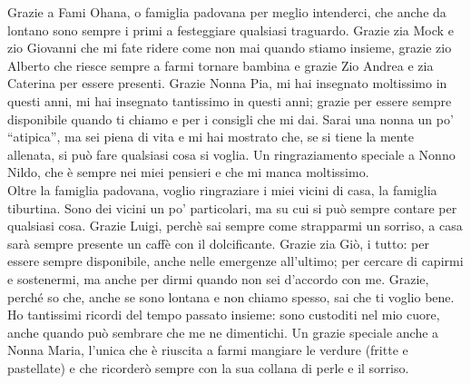 \begin{acknowledgments}
Grazie a Fami Ohana, o famiglia padovana per meglio intenderci, che anche da lontano sono sempre i primi a festeggiare qualsiasi traguardo. Grazie zia Mock e zio Giovanni che mi fate ridere come non mai quando stiamo insieme, grazie zio Alberto che riesce sempre a farmi tornare bambina e grazie Zio Andrea e zia Caterina per essere presenti. Grazie Nonna Pia, mi hai insegnato moltissimo in questi anni, mi hai insegnato tantissimo in questi anni; grazie per essere sempre disponibile quando ti chiamo e per i consigli che mi dai. Sarai una nonna un po’ “atipica”, ma sei piena di vita e mi hai mostrato che, se si tiene la mente allenata, si può fare qualsiasi cosa si voglia. Un ringraziamento speciale a Nonno Nildo, che è sempre nei miei pensieri e che mi manca moltissimo. \\

Oltre la famiglia padovana, voglio ringraziare i miei vicini di casa, la famiglia tiburtina. Sono dei vicini un po' particolari, ma su cui si può sempre contare per qualsiasi cosa. Grazie Luigi, perchè sai sempre come strapparmi un sorriso, a casa sarà sempre presente un caffè con il dolcificante. Grazie zia Giò, i tutto: per essere sempre disponibile, anche nelle emergenze all’ultimo; per cercare di capirmi e sostenermi, ma anche per dirmi quando non sei d’accordo con me. Grazie, perché so che, anche se sono lontana e non chiamo spesso, sai che ti voglio bene. Ho tantissimi ricordi del tempo passato insieme: sono custoditi nel mio cuore, anche quando può sembrare che me ne dimentichi. Un grazie speciale anche a Nonna Maria, l'unica che è riuscita a farmi mangiare le verdure (fritte e pastellate) e che ricorderò sempre con la sua collana di perle e il sorriso. \\


\end{acknowledgments}
